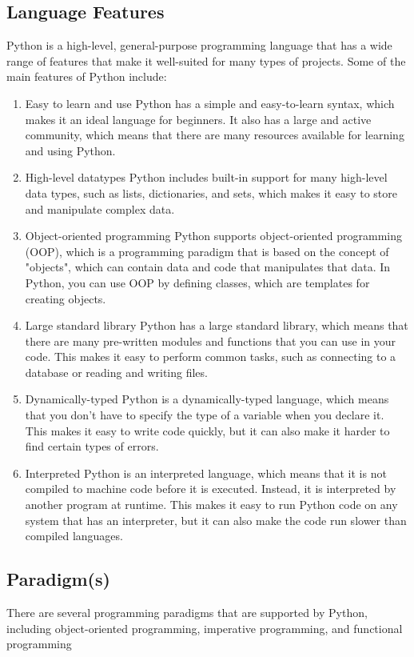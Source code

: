 \documentclass{article}
\begin{document}
\subsection*{Language Features}
Python is a high-level, general-purpose programming language that has a wide range of features that make it well-suited for many types of projects. Some of the main features of Python include:
\begin{enumerate}
  \item Easy to learn and use
    \subitem Python has a simple and easy-to-learn syntax, which makes it an ideal language for beginners. It also has a large and active community, which means that there are many resources available for learning and using Python.
  \item High-level datatypes 
    \subitem Python includes built-in support for many high-level data types, such as lists, dictionaries, and sets, which makes it easy to store and manipulate complex data.
  \item Object-oriented programming
    \subitem Python supports object-oriented programming (OOP), which is a programming paradigm that is based on the concept of "objects", which can contain data and code that manipulates that data. In Python, you can use OOP by defining classes, which are templates for creating objects.
  \item Large standard library
    \subitem Python has a large standard library, which means that there are many pre-written modules and functions that you can use in your code. This makes it easy to perform common tasks, such as connecting to a database or reading and writing files.
  \item Dynamically-typed 
    \subitem Python is a dynamically-typed language, which means that you don't have to specify the type of a variable when you declare it. This makes it easy to write code quickly, but it can also make it harder to find certain types of errors.
  \item Interpreted
    \subitem Python is an interpreted language, which means that it is not compiled to machine code before it is executed. Instead, it is interpreted by another program at runtime. This makes it easy to run Python code on any system that has an interpreter, but it can also make the code run slower than compiled languages.
\end{enumerate}

\subsection*{Paradigm(s)}
There are several programming paradigms that are supported by Python, including object-oriented programming, imperative programming, and functional programming
\end{document}
